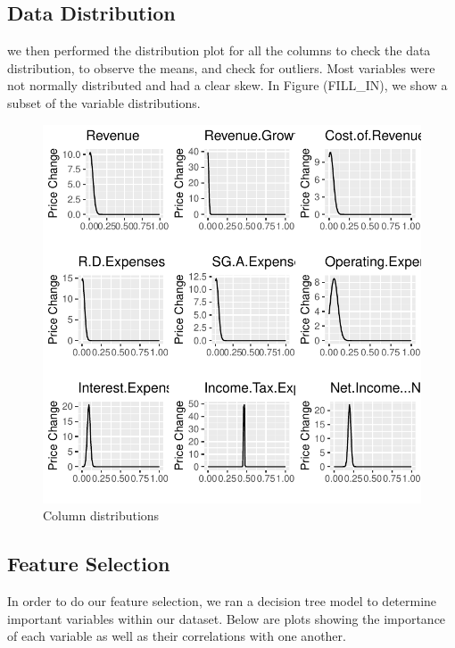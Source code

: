 \documentclass[11pt,]{article}
\begin{document}
\hypertarget{data-distribution}{%
\subsection{Data Distribution}\label{data-distribution}}

we then performed the distribution plot for all the columns to check the
data distribution, to observe the means, and check for outliers. Most
variables were not normally distributed and had a clear skew. In Figure
(FILL\_IN), we show a subset of the variable distributions.

\begin{figure}

{\centering \includegraphics{stock_analysis_files/figure-latex/data normal distribution plot1-1} 

}

\caption{Column distributions}\label{fig:data normal distribution plot1}
\end{figure}

\hypertarget{feature-selection-1}{%
\subsection{Feature Selection}\label{feature-selection-1}}

In order to do our feature selection, we ran a decision tree model to
determine important variables within our dataset. Below are plots
showing the importance of each variable as well as their correlations
with one another.
\end{document}
